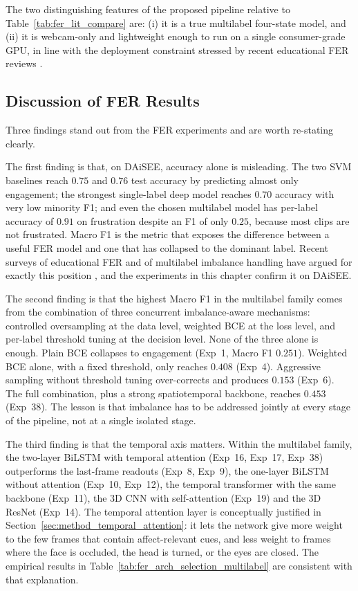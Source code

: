 The two distinguishing features of the proposed pipeline relative to Table~\ref{tab:fer_lit_compare} are: (i) it is a true multilabel four-state model, and (ii) it is webcam-only and lightweight enough to run on a single consumer-grade GPU, in line with the deployment constraint stressed by recent educational FER reviews \cite{lek_academic_2023,florestiyanto_emotion_2024,vistorte_integrating_2024}.

\subsection{Discussion of FER Results}\label{sec:results_fer_discussion}

Three findings stand out from the FER experiments and are worth re-stating clearly.

The first finding is that, on DAiSEE, accuracy alone is misleading. The two SVM baselines reach $0.75$ and $0.76$ test accuracy by predicting almost only engagement; the strongest single-label deep model reaches $0.70$ accuracy with very low minority F1; and even the chosen multilabel model has per-label accuracy of $0.91$ on frustration despite an F1 of only $0.25$, because most clips are not frustrated. Macro F1 is the metric that exposes the difference between a useful FER model and one that has collapsed to the dominant label. Recent surveys of educational FER and of multilabel imbalance handling have argued for exactly this position \cite{lek_academic_2023,santoni_convolutional_2023,rianto_engagement_2025}, and the experiments in this chapter confirm it on DAiSEE.

The second finding is that the highest Macro F1 in the multilabel family comes from the combination of three concurrent imbalance-aware mechanisms: controlled oversampling at the data level, weighted BCE at the loss level, and per-label threshold tuning at the decision level. None of the three alone is enough. Plain BCE collapses to engagement (Exp~1, Macro F1 $0.251$). Weighted BCE alone, with a fixed threshold, only reaches $0.408$ (Exp~4). Aggressive sampling without threshold tuning over-corrects and produces $0.153$ (Exp~6). The full combination, plus a strong spatiotemporal backbone, reaches $0.453$ (Exp~38). The lesson is that imbalance has to be addressed jointly at every stage of the pipeline, not at a single isolated stage.

The third finding is that the temporal axis matters. Within the multilabel family, the two-layer BiLSTM with temporal attention (Exp~16, Exp~17, Exp~38) outperforms the last-frame readouts (Exp~8, Exp~9), the one-layer BiLSTM without attention (Exp~10, Exp~12), the temporal transformer with the same backbone (Exp~11), the 3D CNN with self-attention (Exp~19) and the 3D ResNet (Exp~14). The temporal attention layer is conceptually justified in Section~\ref{sec:method_temporal_attention}: it lets the network give more weight to the few frames that contain affect-relevant cues, and less weight to frames where the face is occluded, the head is turned, or the eyes are closed. The empirical results in Table~\ref{tab:fer_arch_selection_multilabel} are consistent with that explanation.

